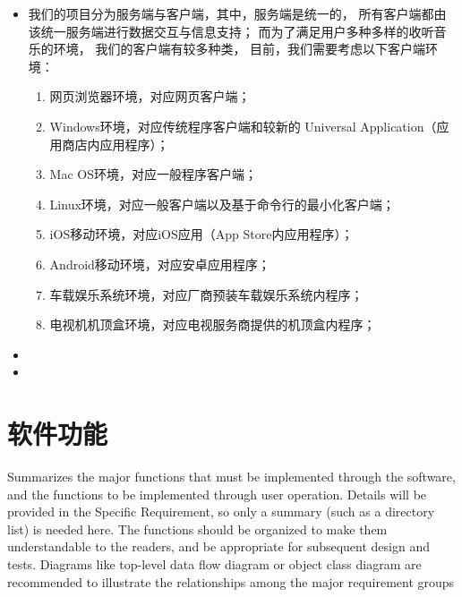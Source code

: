 \begin{itemize}
    \item 我们的项目分为服务端与客户端，其中，服务端是统一的，
    所有客户端都由该统一服务端进行数据交互与信息支持；
    而为了满足用户多种多样的收听音乐的环境，
    我们的客户端有较多种类，
    目前，我们需要考虑以下客户端环境：
    \begin{enumerate}
        \item 网页浏览器环境，对应网页客户端；
        \item Windows环境，对应传统程序客户端和较新的
        Universal Application（应用商店内应用程序）；
        \item Mac OS环境，对应一般程序客户端；
        \item Linux环境，对应一般客户端以及基于命令行的最小化客户端；
        \item iOS移动环境，对应iOS应用（App Store内应用程序）；
        \item Android移动环境，对应安卓应用程序；
        \item 车载娱乐系统环境，对应厂商预装车载娱乐系统内程序；
        \item 电视机机顶盒环境，对应电视服务商提供的机顶盒内程序；
    \end{enumerate}
    \item
    \item
\end{itemize}








\section{软件功能}
Summarizes the major functions that must be implemented through the software, and the functions to be implemented through user operation. Details will be provided in the Specific Requirement, so only a summary (such as a directory list) is needed here. The functions should be organized to make them understandable to the readers, and be appropriate for subsequent design and tests. Diagrams like top-level data flow diagram or object class diagram are recommended to illustrate the relationships among the major requirement groups


